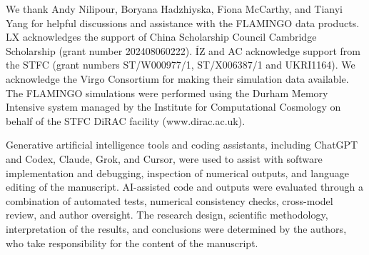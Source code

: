 \documentclass[aps,prd,twocolumn,superscriptaddress,nofootinbib,floatfix]{revtex4-2}
\begin{document}
\begin{acknowledgments}
We thank Andy Nilipour, Boryana Hadzhiyska, Fiona McCarthy, and Tianyi Yang for helpful discussions and assistance with the FLAMINGO data products. LX acknowledges the support of China Scholarship Council Cambridge Scholarship (grant number 202408060222). ÍZ and AC acknowledge support from the STFC (grant numbers ST/W000977/1, ST/X006387/1 and UKRI1164). We acknowledge the Virgo Consortium for making their simulation data available. The FLAMINGO simulations were performed using the Durham Memory Intensive system managed by the Institute for Computational Cosmology on behalf of the STFC DiRAC facility (www.dirac.ac.uk).

Generative artificial intelligence tools and coding assistants, including ChatGPT and Codex, Claude, Grok, and Cursor, were used to assist with software implementation and debugging, inspection of numerical outputs, and language editing of the manuscript. AI-assisted code and outputs were evaluated through a combination of automated tests, numerical consistency checks, cross-model review, and author oversight. The research design, scientific methodology, interpretation of the results, and conclusions were determined by the authors, who take responsibility for the content of the manuscript.
\end{acknowledgments}
\appendix
\end{document}
